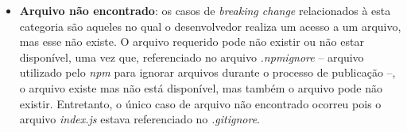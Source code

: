 \begin{itemize}

    \item \textbf{Arquivo não encontrado}: os casos de \textit{breaking change} relacionados à esta categoria são aqueles no qual o desenvolvedor realiza um acesso a um arquivo, mas esse não existe. O arquivo requerido pode não existir ou não estar disponível, uma vez que, referenciado no arquivo \textit{.npmignore} -- arquivo utilizado pelo \textit{npm} para ignorar arquivos durante o processo de publicação --, o arquivo existe mas não está disponível, mas também o arquivo pode não existir. Entretanto, o único caso de arquivo não encontrado ocorreu pois o arquivo \textit{index.js} estava referenciado no \textit{.gitignore}.%

\end{itemize}{}